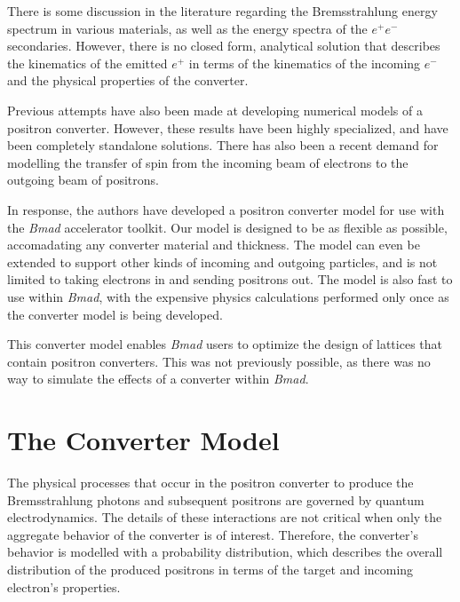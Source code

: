 \documentclass[letter,
               biblatex,     %
               keeplastbox,   %
               ]{jacow}
\newcommand{\bmad}{\textit{Bmad}}
\begin{document}
There is some discussion in the literature regarding the Bremsstrahlung energy spectrum in various materials, %
as well as the energy spectra of the $e^+ e^-$ secondaries. %
However, there is no closed form, analytical solution that describes the kinematics of the emitted $e^+$ in terms of the kinematics of the incoming $e^-$ and the physical properties of the converter.

Previous attempts have also been made at developing numerical models of a positron converter. %
However, these results have been highly specialized, and have been completely standalone solutions. %
There has also been a recent demand for modelling the transfer of spin from the incoming beam of electrons to the outgoing beam of positrons. %

In response, the authors have developed a positron converter model for use with the \bmad{} accelerator toolkit.
Our model is designed to be as flexible as possible, accomadating any converter material and thickness.
The model can even be extended to support other kinds of incoming and outgoing particles, and is not limited to taking electrons in and sending positrons out.
The model is also fast to use within \bmad{}, with the expensive physics calculations performed only once as the converter model is being developed. %

This converter model enables \bmad{} users to optimize the design of lattices that contain positron converters.
This was not previously possible, as there was no way to simulate the effects of a converter within \bmad{}. %


\section{The Converter Model}

The physical processes that occur in the positron converter to produce the Bremsstrahlung photons and subsequent positrons are governed by quantum electrodynamics. %
The details of these interactions are not critical when only the aggregate behavior of the converter is of interest.
Therefore, the converter's behavior is modelled with a probability distribution, which describes the overall distribution of the produced positrons in terms of the target and incoming electron's properties. %
\end{document}
